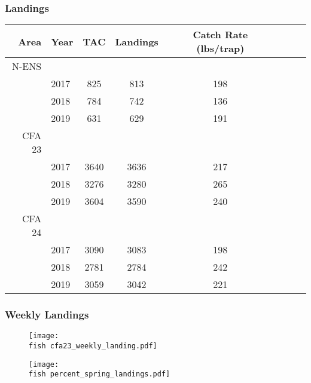 \documentclass{beamer}
\begin{document}
	\begin{frame}
		\frametitle{Landings}
		
		\begin{table}[ht]
			\centering
			\begin{tabular}{rlccclrr}
				\hline
				Area & Year & TAC & Landings & Catch Rate (lbs/trap) \\ 
				\hline
				N-ENS & & & & \\
				& 2017 & 825 & 813 & 198 \\
				& 2018 & 784 & 742 & 136 \\
				& 2019 & 631 & 629 & 191 \\
				\hline
				CFA 23 & & & & \\
				& 2017 & 3640 & 3636 & 217 \\
				& 2018 & 3276 & 3280 & 265 \\
				& 2019 & 3604 & 3590 & 240 \\
				\hline
				CFA 24 & & & & \\
				& 2017 & 3090 & 3083 & 198 \\
				& 2018 & 2781 & 2784 & 242 \\
				& 2019 & 3059 & 3042 & 221 \\
				
				\hline
				\hline
			\end{tabular}
		\end{table}
		
		
		
	\end{frame}
	




\begin{frame}
\frametitle{Weekly Landings}
	\begin{figure}

 \vspace*{-0.5cm}
 \centerline{\texttt{[image: \\fish cfa23\_weekly\_landing.pdf]}}

 \end{figure}
\end{frame}


\begin{frame}
\begin{figure}

 \vspace*{-0.25cm}
 \centerline{\texttt{[image: \\fish percent\_spring\_landings.pdf]}}

 \end{figure}
\end{frame}
\end{document}
